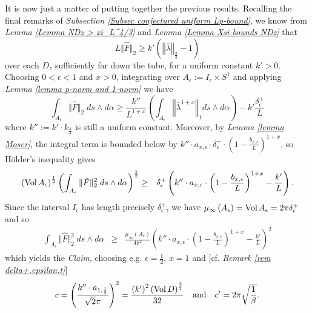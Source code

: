 \documentclass{article}
\newcommand{\func}[1]{\textnormal {#1\,}}
\newcommand{\bl}{\bar\lambda}
\newcommand{\vol}{\func{Vol}}
\begin{document}
It is now just a matter of putting together the previous results. Recalling the final remarks of \emph{Subsection \ref{Subsec conjectured uniform Lp-bound}}, we know from  \emph{Lemma \ref{Lemma NDz > xi_L^4/3}} and \emph{Lemma \ref{Lemma Xsi bounds NDz}} that
\begin{displaymath}
        L\Vert \hat F \Vert_2 \geq k'
        \left( \left\Vert \bl\right\Vert_{\frac{4}{3}} -1\right)
\end{displaymath}  
over each $D_z$ sufficiently far down the tube, for a uniform constant $k'>0$. Choosing $0<\epsilon<1$ and $x>0$, integrating over $A_\epsilon:= I_\epsilon\times S^1$ and applying \emph{Lemma \ref{lemma p-norm and 1-norm}} we have
\begin{displaymath}
        \int_{A_\epsilon} \Vert \hat F \Vert_2  \;ds\wedge d\alpha
        \geq  \frac{k''}{L^{1+x}}
        \left(\int_{A_\epsilon}\left\Vert \bl^{1+x} \right\Vert_1 
        ds\wedge d\alpha \right)
        -k'\frac{\delta_\epsilon^+}{L}
\end{displaymath}
where $k'':= k' \cdot k_\frac{4}{3}$ is still a uniform constant. Moreover, by \emph{Lemma \ref{lemma Moser}}, the integral term is bounded below by 
$k'' \cdot a_{x,\epsilon} \cdot\delta^+_{\epsilon } \cdot
        \left(1-\frac{b_{x, \epsilon}}{L} \right)^{1+x}$, so H\"older's inequality gives
\begin{eqnarray*}
        \left(\vol A_\epsilon \right)^{\frac{1}{2}}
        \left(\int_{A_\epsilon}\Vert \hat F \Vert_2^2 \; ds\wedge d\alpha\right)^\frac{1}{2}
        &\geq& \delta^+_{\epsilon}
        \left(
                k'' \cdot a_{x,\epsilon}  \cdot 
                \left(1-\frac{b_{x, \epsilon}}{L} \right)^{1+x} 
                -\frac{k'}{L}
        \right).
\end{eqnarray*}
Since the interval $I_\epsilon$ has length precisely $\delta^+_\epsilon$, we have
$\mu_{\infty}\left( A_\epsilon \right)=\vol A_\epsilon =2\mathbb{\pi}\delta^+_\epsilon$ and so
\begin{eqnarray*}
         \int_{A_\epsilon}\Vert \hat F \Vert_2^2 \; ds\wedge d\alpha         &\geq& \frac{\mu_{\infty}\left( A_\epsilon \right)}{4\mathbb{\pi}^2}
    \left(
                k'' \cdot a_{x,\epsilon}  \cdot 
                \left(1-\frac{b_{x, \epsilon}}{L} \right)^{1+x} 
                -\frac{k'}{L}
        \right)^2
\end{eqnarray*}
which yields the \emph{Claim}, choosing e.g. $\epsilon=\frac{1}{2}$, $x=1$ and [cf. \emph{Remark \ref{rem delta+,epsilon,t}}]
\begin{displaymath}
        c=
        \left( 
        \frac{k'' \cdot a_{1,\frac{1}{2}}}{\sqrt{2}\mathbf{\pi}}
        \right)^2 
        =
        \frac{\left(k'\right)^2\left(\vol D\right)^{\frac{3}{2}}}{32}
        \quad \text{and} \quad   
        c'=2\mathbb{\pi}\sqrt{\frac{1}{\beta}}.\\
\end{displaymath}
\end{document}
